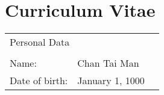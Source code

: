 
\chapter{Curriculum Vitae}

\begin{table}[H]
\begin{tabular}{lll}
\multicolumn{3}{l}{Personal Data}                                               \\
                &                                &                              \\
Name:           & Chan Tai Man                   &                              \\
Date of birth:  & January 1, 1000                &                              \\
\end{tabular}
\end{table} 